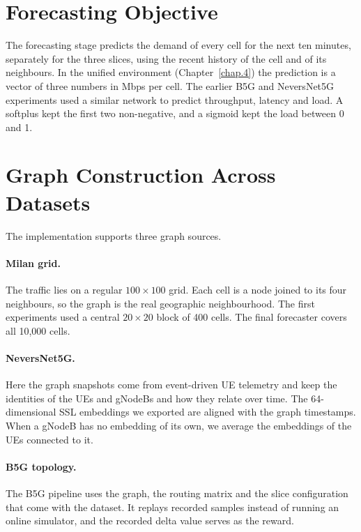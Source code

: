 \label{chap.6}
\section{Forecasting Objective}
\label{sec:forecasting_objective}
The forecasting stage predicts the demand of every cell for the next ten minutes, separately for the three slices, using the recent history of the cell and of its neighbours. In the unified environment (Chapter~\ref{chap.4}) the prediction is a vector of three numbers in Mbps per cell. The earlier B5G and NeversNet5G experiments used a similar network to predict throughput, latency and load. A softplus kept the first two non-negative, and a sigmoid kept the load between 0 and 1.

\section{Graph Construction Across Datasets}
\label{sec:graph_construction}
The implementation supports three graph sources.
\paragraph{Milan grid.} The traffic lies on a regular $100\times100$ grid. Each cell is a node joined to its four neighbours, so the graph is the real geographic neighbourhood. The first experiments used a central $20\times20$ block of 400 cells. The final forecaster covers all 10{,}000 cells.
\paragraph{NeversNet5G.} Here the graph snapshots come from event-driven UE telemetry and keep the identities of the UEs and gNodeBs and how they relate over time. The 64-dimensional SSL embeddings we exported are aligned with the graph timestamps. When a gNodeB has no embedding of its own, we average the embeddings of the UEs connected to it.
\paragraph{B5G topology.} The B5G pipeline uses the graph, the routing matrix and the slice configuration that come with the dataset. It replays recorded samples instead of running an online simulator, and the recorded delta value serves as the reward.

